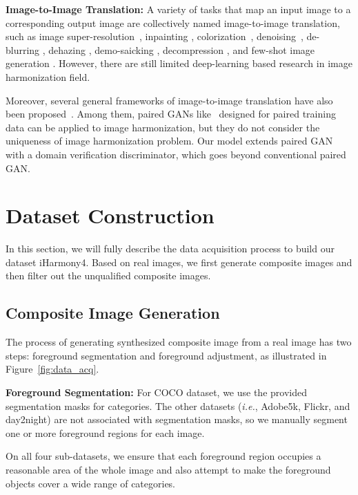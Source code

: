 \documentclass[10pt,twocolumn,letterpaper]{article}
\begin{document}
\textbf{Image-to-Image Translation: }A variety of tasks that map an input image to a corresponding output image are collectively named image-to-image translation, such as image super-resolution~\cite{kim2016super-res,kim2016super-res_recursive,ledig2017super-resolution-gan}, inpainting \cite{inpainting,zhang2019GAIN}, colorization~\cite{zhang2016colorful,larsson2016colorization}, denoising~\cite{image-denoising}, de-blurring \cite{deblurring}, dehazing \cite{ren2016dehaze,dehazeNet}, demo-saicking \cite{demosaicking}, decompression \cite{dong2015compression}, and few-shot image generation \cite{fewshotimage2020}. However, there are still limited deep-learning based research in image harmonization field.

Moreover, several general frameworks of image-to-image translation have also been proposed~\cite{pixelGAN,cGAN,zhang2019multi}. Among them, paired GANs like~\cite{pixelGAN} designed for paired training data can be applied to image harmonization, but they do not consider the uniqueness of image harmonization problem. Our model extends paired GAN with a domain verification discriminator, which goes beyond conventional paired GAN.


\section{Dataset Construction} \label{sec:data_cons}
In this section, we will fully describe the data acquisition process to build our dataset iHarmony4. Based on real images, we first generate composite images and then filter out the unqualified composite images.

\subsection{Composite Image Generation}\label{sec:syn_img_gen}

The process of generating synthesized composite image from a real image has two steps: foreground segmentation and foreground adjustment, as illustrated in Figure~\ref{fig:data_acq}.

\noindent\textbf{Foreground Segmentation: }For COCO dataset, we use the provided segmentation masks for  categories. The other datasets (\emph{i.e.}, Adobe5k, Flickr, and day2night) are not associated with segmentation masks, so we manually segment one or more foreground regions for each image. 

On all four sub-datasets, we ensure that each foreground region occupies a reasonable area of the whole image and also attempt to make the foreground objects cover a wide range of categories.
\end{document}
